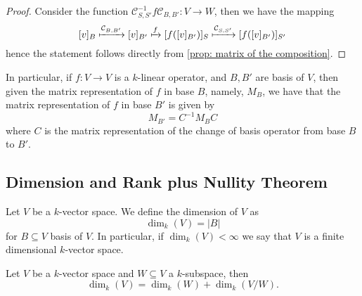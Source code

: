 \begin{proof}
Consider the function \(\mathcal{C}_{S, S'}^{-1}  f  \mathcal{C}_{B,
B'} : V \to W\), then we have the mapping
\[
  [v]_B \xmapsto{\mathcal{C}_{B, B'}} [v]_{B'}
  \xmapsto f [f([v]_{B'})]_S
  \xmapsto{\mathcal{C}_{S, S'}} [f([v]_{B'})]_{S'}
\]
hence the statement follows directly from \cref{prop: matrix of the
composition}.
\end{proof}

\begin{corollary}\label{cor: change of basis, linear operator}
In particular, if \(f : V \to V\) is a \(k\)-linear operator, and \(B, B'\)
are basis of \(V\), then given the matrix representation of \(f\) in base
\(B\), namely, \(M_B\), we have that the matrix representation of \(f\) in
base \(B'\) is given by
\[
  M_{B'} = C^{-1} M_B C
\]
where \(C\) is the matrix representation of the change of basis operator from
base \(B\) to \(B'\).
\end{corollary}

\subsection{Dimension and Rank plus Nullity Theorem}

\begin{definition}
Let \(V\) be a \(k\)-vector space. We define the dimension of \(V\) as
\[
  \dim_k(V) = |B|
\]
for \(B \subseteq V\) basis of \(V\). In particular, if \(\dim_k(V) < \infty\)
we say that \(V\) is a finite dimensional \(k\)-vector space.
\end{definition}

\begin{lemma}\label{lem: rank plus nullity lemma}
Let \(V\) be a \(k\)-vector space and \(W \subseteq V\) a \(k\)-subspace, then
\[
  \dim_k(V) = \dim_k(W) + \dim_k(V/W).
\]
\end{lemma}

